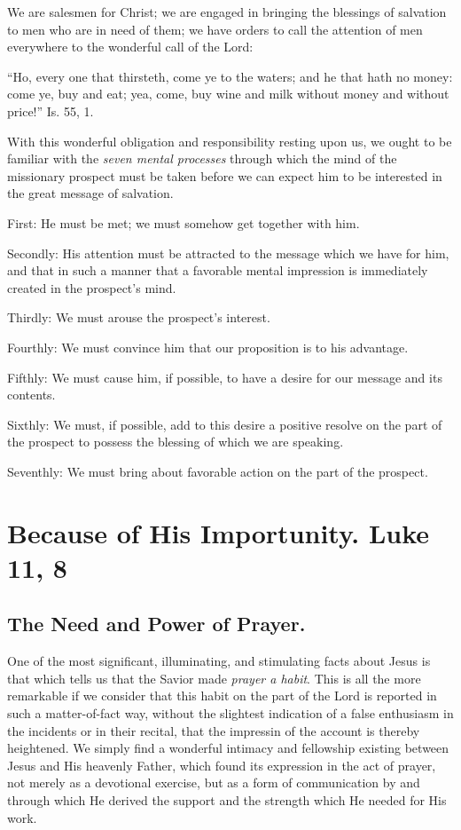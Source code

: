 \documentclass[
]{book}
\begin{document}
We are salesmen for Christ; we are engaged in bringing the blessings of salvation to men who are in need of them; we have orders to call the attention of men everywhere to the wonderful call of the Lord:

``Ho, every one that thirsteth, come ye to the waters; and he that hath no money: come ye, buy and eat; yea, come, buy wine and milk without money and without price!'' Is. 55, 1.

With this wonderful obligation and responsibility resting upon us, we ought to be familiar with the \emph{seven mental processes} through which the mind of the missionary prospect must be taken before we can expect him to be interested in the great message of salvation.

First: He must be met; we must somehow get together with him.

Secondly: His attention must be attracted to the message which we have for him, and that in such a manner that a favorable mental impression is immediately created in the prospect's mind.

Thirdly: We must arouse the prospect's interest.

Fourthly: We must convince him that our proposition is to his advantage.

Fifthly: We must cause him, if possible, to have a desire for our message and its contents.

Sixthly: We must, if possible, add to this desire a positive resolve on the part of the prospect to possess the blessing of which we are speaking.

Seventhly: We must bring about favorable action on the part of the prospect.

\hypertarget{because-of-his-importunity.-luke-11-8}{%
\chapter{Because of His Importunity. Luke 11, 8}\label{because-of-his-importunity.-luke-11-8}}

\hypertarget{the-need-and-power-of-prayer.}{%
\section*{The Need and Power of Prayer.}\label{the-need-and-power-of-prayer.}}

One of the most significant, illuminating, and stimulating facts about Jesus is that which tells us that the Savior made \emph{prayer a habit}. This is all the more remarkable if we consider that this habit on the part of the Lord is reported in such a matter-of-fact way, without the slightest indication of a false enthusiasm in the incidents or in their recital, that the impressin of the account is thereby heightened. We simply find a wonderful intimacy and fellowship existing between Jesus and His heavenly Father, which found its expression in the act of prayer, not merely as a devotional exercise, but as a form of communication by and through which He derived the support and the strength which He needed for His work.
\end{document}
